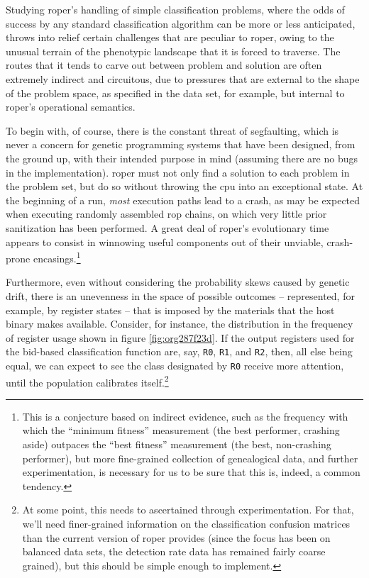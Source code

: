 \documentclass[12pt,glossary]{dalthesis}
\begin{document}
Studying \gls{roper}'s handling of simple classification problems, where the
odds of success by any standard classification algorithm can be more or less
anticipated, throws into relief certain challenges that are peculiar to \gls{roper},
owing to the unusual terrain of the phenotypic landscape that it is forced to
traverse. The routes that it tends to carve out between problem and solution
are often extremely indirect and circuitous, due to pressures that are external
to the shape of the problem space, as specified in the data set, for example, but
internal to \gls{roper}'s operational semantics.

To begin with, of course, there is the constant threat of segfaulting, which is
never a concern for genetic programming systems that have been designed, from the
ground up, with their intended purpose in mind (assuming there are no bugs in the
implementation). \Gls{roper} must not only find a solution to each problem in the
problem set, but do so without throwing the \gls{cpu} into an exceptional state. At
the beginning of a run, \emph{most} execution paths lead to a crash, as may be expected
when executing randomly assembled \gls{rop} chains, on which very little prior
sanitization has been performed. A great deal of \gls{roper's} evolutionary time
appears to consist in winnowing useful components out of their unviable, crash-prone
encasings.\footnote{This is a conjecture based on indirect evidence, such as the frequency with which
  the ``minimum fitness'' measurement (the best performer, crashing aside) outpaces
  the ``best fitness'' measurement (the best, non-crashing performer), but more
  fine-grained collection of genealogical data, and further experimentation, is
  necessary for us to be sure that this is, indeed, a common tendency.} 


Furthermore, even without considering the probability skews caused by genetic drift,
there is an unevenness in the space of possible outcomes -- represented, for example,
by register states -- that is imposed by the materials that the host binary makes
available. Consider, for instance, the distribution in the frequency of register
usage shown in figure \ref{fig:org287f23d}. If the output registers
used for the bid-based classification function are, say, \texttt{R0}, \texttt{R1}, and \texttt{R2}, then,
all else being equal, we can expect to see the class designated by \texttt{R0} receive 
more attention, until the population calibrates itself.\footnote{At some point, this needs to ascertained through experimentation. For that, we'll
  need finer-grained information on the classification confusion matrices than the
  current version of \gls{roper} provides (since the focus has been on balanced data
  sets, the detection rate data has remained fairly coarse grained), but this should
  be simple enough to implement.}
\end{document}
